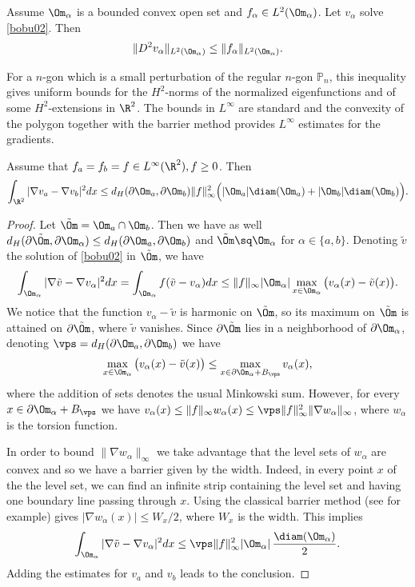 \begin{propo}[Grisvard]
Assume $\Om_\alpha$ is a bounded convex open set and $f_\alpha \in L^2(\Om_\alpha)$.
Let $v_\alpha$ solve \eqref{bobu02}. Then
\[
\|D^2 v_\alpha\|_{L^2(\Om_\alpha)} \le \|f_\alpha\|_{L^2(\Om_\alpha)}.
\]
\end{propo}
For a $n$-gon which is a small perturbation of the regular $n$-gon $\mathbb P_n$, this inequality gives uniform bounds for the $H^2$-norms of the normalized eigenfunctions and of some $H^2$\nobreakdash-extensions in $\R^2$. The bounds in $L^\infty$ are standard and the convexity of the polygon together with the barrier method provides $L^\infty$ estimates for the gradients.

\begin{lemma}\label{bb05}
Assume that $f_a=f_b= f \in L^\infty (\R^2), f \ge 0$. Then
\begin{equation}\label{bb05.1}
\int_{\R^2} |\nabla v_{a}-\nabla v_b |^2 dx\le d_H(\partial \Om_{a}, \partial \Om_{b}) \|f\|_\infty^2 \Big (|\Om_a|\diam (\Om_a) +|\Om_b|\diam (\Om_b)\Big).
\end{equation}
\end{lemma}
\begin{proof}
Let $\tilde \Om =\Om_a \cap \Om_b$. Then we have as well $d_H(\partial \tilde \Om, \partial \Om_\alpha) \le d_H(\partial \Om_{a}, \partial \Om_{b}) $ and $\tilde \Om \sq \Om_\alpha$ for $\alpha\in \{a,b\}$. Denoting $\tilde v$ the solution of \eqref{bobu02} in $\tilde \Om$, we have
\[
\int_{\Om_\alpha} |\nabla \tilde v -\nabla v_\alpha |^2 dx= \int_{\Om_\alpha} f(\tilde v-v_\alpha) dx\le\|f\|_\infty |\Om_\alpha| \max_{x \in\Om_\alpha} \big (v_\alpha(x)-\tilde v (x)\big).
\]
We notice that the function $v_\alpha -\tilde v$ is harmonic on $\tilde \Om$, so its maximum on $\tilde \Om$ is attained on $\partial \tilde \Om$, where $\tilde v$ vanishes. Since $\partial \tilde \Om$ lies in a neighborhood of $\partial \Om_\alpha$, denoting $\vps = d_H(\partial \Om_{a}, \partial \Om_{b})$ we have
\[
\max_{x \in\Om_\alpha } \big (v_\alpha(x)-\tilde v (x) \big) \le \max_{x \in \partial \Om_\alpha + B_\vps}v_\alpha(x),
\]
where the addition of sets denotes the usual Minkowski sum.
However, for every $x \in \partial \Om_\alpha + B_\vps$ we have $v_\alpha(x)\le \|f\|_\infty w_\alpha(x)\le \vps \|f\|_\infty^2 \|\nabla w_\alpha \|_\infty$, where $w_\alpha$ is the torsion function.

In order to bound $\|\nabla w_\alpha \|_\infty$ we take advantage that the level sets of $w_\alpha$ are convex and so we have a barrier given by the width. Indeed, in every point $x$ of the the level set, we can find an infinite strip containing the level set and having one boundary line passing through $x$. Using the classical barrier method (see \cite{Tr72} for example) gives $ |\nabla w_{\alpha}(x)| \le W_x/2$, where $W_x$ is the width. This implies
\[
\int_{\Om_\alpha} |\nabla \tilde v-\nabla v_\alpha |^2 dx \le \vps \|f\|_\infty^2 |\Om_\alpha| \,\frac{\diam (\Om_\alpha)}{ 2}.
\]
Adding the estimates for $v_a$ and $v_b$ leads to the conclusion.
\end{proof}

